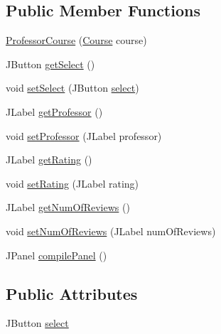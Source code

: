 \subsection*{Public Member Functions}
\begin{DoxyCompactItemize}
\item 
\mbox{\hyperlink{classcom_1_1_b_n_u_1_1pages_1_1classes_by_teacher_1_1_professor_course_a398c32e20319b169192c5b0b49f5fb8a}{Professor\+Course}} (\mbox{\hyperlink{classcom_1_1_b_n_u_1_1pages_1_1classes_by_teacher_1_1_course}{Course}} course)
\item 
J\+Button \mbox{\hyperlink{classcom_1_1_b_n_u_1_1pages_1_1classes_by_teacher_1_1_professor_course_afa6c352bb6cd6737884ca99cc75684ac}{get\+Select}} ()
\item 
void \mbox{\hyperlink{classcom_1_1_b_n_u_1_1pages_1_1classes_by_teacher_1_1_professor_course_ab8d6b35bc8fc8f1cfab48b41dd72b57b}{set\+Select}} (J\+Button \mbox{\hyperlink{classcom_1_1_b_n_u_1_1pages_1_1classes_by_teacher_1_1_professor_course_a20ac39fa804d23a4b71bf8edb8416067}{select}})
\item 
J\+Label \mbox{\hyperlink{classcom_1_1_b_n_u_1_1pages_1_1classes_by_teacher_1_1_professor_course_a34d6c81cc1e5105fbbd8f56f9c8fdd2e}{get\+Professor}} ()
\item 
void \mbox{\hyperlink{classcom_1_1_b_n_u_1_1pages_1_1classes_by_teacher_1_1_professor_course_aa24ed9ec329e2a06be4a201dec6e3b07}{set\+Professor}} (J\+Label professor)
\item 
J\+Label \mbox{\hyperlink{classcom_1_1_b_n_u_1_1pages_1_1classes_by_teacher_1_1_professor_course_a9b94a06e5cca755d61bf029bcf8ef08d}{get\+Rating}} ()
\item 
void \mbox{\hyperlink{classcom_1_1_b_n_u_1_1pages_1_1classes_by_teacher_1_1_professor_course_ad115f189677dc409527713d0e681ed4e}{set\+Rating}} (J\+Label rating)
\item 
J\+Label \mbox{\hyperlink{classcom_1_1_b_n_u_1_1pages_1_1classes_by_teacher_1_1_professor_course_adfb57af9a287e51b17f697ffdf68e96d}{get\+Num\+Of\+Reviews}} ()
\item 
void \mbox{\hyperlink{classcom_1_1_b_n_u_1_1pages_1_1classes_by_teacher_1_1_professor_course_ac25ae3b454c5828d96dae6823b04edc8}{set\+Num\+Of\+Reviews}} (J\+Label num\+Of\+Reviews)
\item 
J\+Panel \mbox{\hyperlink{classcom_1_1_b_n_u_1_1pages_1_1classes_by_teacher_1_1_professor_course_ab402bca75b69077b5a439ae5441bdba4}{compile\+Panel}} ()
\end{DoxyCompactItemize}
\subsection*{Public Attributes}
\begin{DoxyCompactItemize}
\item 
J\+Button \mbox{\hyperlink{classcom_1_1_b_n_u_1_1pages_1_1classes_by_teacher_1_1_professor_course_a20ac39fa804d23a4b71bf8edb8416067}{select}}
\end{DoxyCompactItemize}


